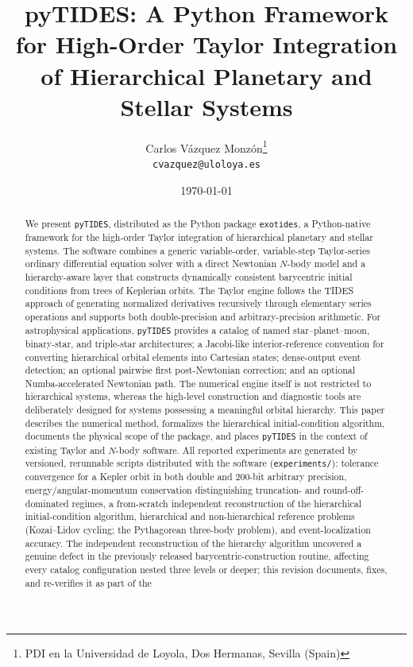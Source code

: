 \documentclass[11pt]{article}
\title{\textbf{pyTIDES}: A Python Framework for High-Order Taylor Integration\\
of Hierarchical Planetary and Stellar Systems}
\author{%
  Carlos Vázquez Monzón\thanks{PDI en la Universidad de Loyola, Dos Hermanas, Sevilla (Spain)} \\
  \texttt{cvazquez@uloloya.es}
}
\date{\today}
\begin{document}
\maketitle

\begin{abstract}
We present \texttt{pyTIDES}, distributed as the Python package
\texttt{exotides}, a Python-native framework for the high-order Taylor
integration of hierarchical planetary and stellar systems. The software
combines a generic variable-order, variable-step Taylor-series ordinary
differential equation solver with a direct Newtonian $N$-body model and a
hierarchy-aware layer that constructs dynamically consistent barycentric
initial conditions from trees of Keplerian orbits. The Taylor engine follows
the TIDES approach of generating normalized derivatives recursively through
elementary series operations and supports both double-precision and
arbitrary-precision arithmetic. For astrophysical applications,
\texttt{pyTIDES} provides a catalog of named star--planet--moon, binary-star,
and triple-star architectures; a Jacobi-like interior-reference convention
for converting hierarchical orbital elements into Cartesian states;
dense-output event detection; an optional pairwise first post-Newtonian
correction; and an optional Numba-accelerated Newtonian path. The numerical
engine itself is not restricted to hierarchical systems, whereas the
high-level construction and diagnostic tools are deliberately designed for
systems possessing a meaningful orbital hierarchy. This paper describes the
numerical method, formalizes the hierarchical initial-condition algorithm,
documents the physical scope of the package, and places \texttt{pyTIDES} in
the context of existing Taylor and $N$-body software. All reported
experiments are generated by versioned, rerunnable scripts distributed with
the software (\texttt{experiments/}): tolerance convergence for a
Kepler orbit in both double and 200-bit arbitrary precision, energy/angular-momentum
conservation distinguishing truncation- and round-off-dominated regimes, a
from-scratch independent reconstruction of the hierarchical initial-condition
algorithm, hierarchical and non-hierarchical reference problems (Kozai--Lidov
cycling; the Pythagorean three-body problem), and event-localization
accuracy. The independent reconstruction of the hierarchy algorithm
uncovered a genuine defect in the previously released barycentric-construction
routine, affecting every catalog configuration nested three levels or
deeper; this revision documents, fixes, and re-verifies it as part of the

\end{abstract}
\end{document}
